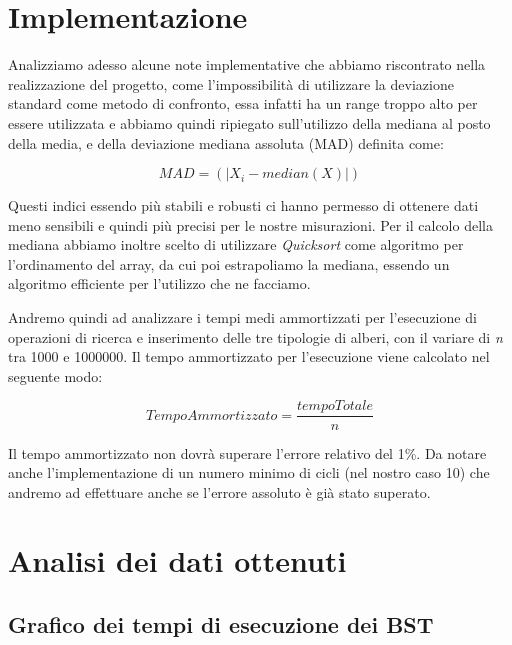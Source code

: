 \documentclass[a4paper,titlepage]{article}
\begin{document}
\section{Implementazione}
Analizziamo adesso alcune note implementative che abbiamo riscontrato nella realizzazione del progetto, come l’impossibilità di utilizzare la deviazione standard come metodo di confronto, essa infatti ha un range troppo alto per essere utilizzata e abbiamo quindi ripiegato sull’utilizzo della mediana al posto della media, e della deviazione mediana assoluta (MAD) definita come:

\[MAD = (|X_i - median(X)|)\]

Questi indici essendo più stabili e robusti ci hanno permesso di ottenere dati meno sensibili e quindi più precisi per le nostre misurazioni.
Per il calcolo della mediana abbiamo inoltre scelto di utilizzare \textit{Quicksort} come algoritmo per l’ordinamento del array, da cui poi estrapoliamo la mediana, essendo un algoritmo efficiente per l’utilizzo che ne facciamo. 

Andremo quindi ad analizzare i tempi medi ammortizzati per l’esecuzione di  operazioni di ricerca e inserimento delle tre tipologie di alberi, con il variare di \textit{n} tra 1000 e 1000000.
Il tempo ammortizzato per l’esecuzione viene calcolato nel seguente modo: 

\[Tempo Ammortizzato = \frac{tempoTotale}{n}\]

Il tempo ammortizzato non dovrà superare l’errore relativo del 1\%.
Da notare anche l’implementazione di un numero minimo di cicli (nel nostro caso 10) che andremo ad effettuare anche se l’errore assoluto è già stato superato.
\newpage

\section{Analisi dei dati ottenuti}

\subsection{Grafico dei tempi di esecuzione dei BST}
\end{document}
